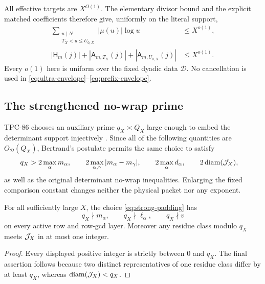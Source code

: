 All effective targets are \(X^{O(1)}\).  The elementary divisor
bound and the explicit matched coefficients therefore give,
uniformly on the literal support,
\begin{align}
 \sum_{\substack{u\mid N\\T_X<u\le U_{0,X}}}
 |\mu(u)|\log u
 &\le X^{o(1)},\label{eq:ultra-envelope}\\
 |\mathsf H_m(j)|
 +|\mathsf A_{m,T_X}(j)|
 +|\mathsf A_{m,U_{0,X}}(j)|
 &\le X^{o(1)}.
\label{eq:prefix-envelope}
\end{align}
Every \(o(1)\) here is uniform over the fixed dyadic data
\(\mathscr D\).  No cancellation is used in
\eqref{eq:ultra-envelope}--\eqref{eq:prefix-envelope}.

\subsection{The strengthened no-wrap prime}

TPC-86 chooses an auxiliary prime \(q_X\asymp Q_X\) large enough to
embed the determinant support injectively \citep{WangTPC86}.  Since
all of the following quantities are \(O_{\mathscr D}(Q_X)\),
Bertrand's postulate permits the same choice to satisfy
\begin{equation}
\begin{split}
 q_X>{}&
 2\max_\alpha m_\alpha,\qquad
 2\max_{\alpha,\gamma}|m_\alpha-m_\gamma|,\qquad
 2\max_\alpha d_\alpha,\qquad
 2\operatorname{diam}(\mathcal J_X),
\end{split}
\label{eq:strong-padding}
\end{equation}
as well as the original determinant no-wrap inequalities.  Enlarging
the fixed comparison constant changes neither the physical packet
nor any exponent.

\begin{lemma}
\label{lem:padding-consequences}
For all sufficiently large \(X\), the choice
\eqref{eq:strong-padding} has
\[
 q_X\nmid m_\alpha,\qquad q_X\nmid\ell_\alpha,\qquad
 q_X\nmid v
\]
on every active row and row-gcd layer.  Moreover any residue class
modulo \(q_X\) meets \(\mathcal J_X\) in at most one integer.
\end{lemma}

\begin{proof}
Every displayed positive integer is strictly between \(0\) and
\(q_X\).  The final assertion follows because two distinct
representatives of one residue class differ by at least \(q_X\),
whereas \(\operatorname{diam}(\mathcal J_X)<q_X\).
\end{proof}


